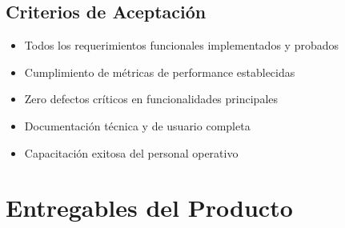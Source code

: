 \documentclass[12pt,letterpaper]{article}
\begin{document}
\subsection{Criterios de Aceptación}
\begin{itemize}
    \item Todos los requerimientos funcionales implementados y probados
    \item Cumplimiento de métricas de performance establecidas
    \item Zero defectos críticos en funcionalidades principales
    \item Documentación técnica y de usuario completa
    \item Capacitación exitosa del personal operativo
\end{itemize}

\section{Entregables del Producto}
\end{document}
